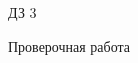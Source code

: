 \begin{homework}[number=3]
	\begin{listofex}
		\item ДЗ 3
	\end{listofex}
\end{homework}

\begin{exam}
	\begin{listofex}
		\item Проверочная работа
	\end{listofex}
\end{exam}
